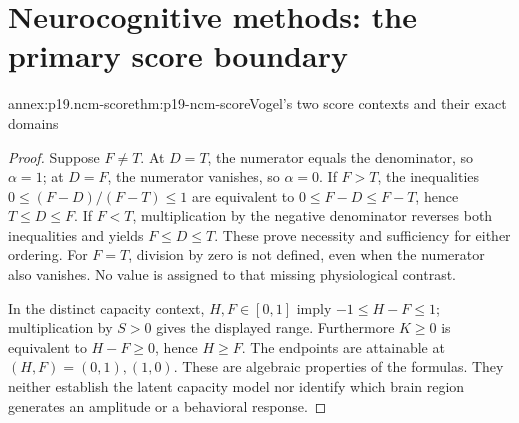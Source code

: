 \section{Neurocognitive methods: the primary score boundary}
\label{sec:p19-ncm-annex}
\begin{annexitem}{annex:p19.ncm-score}{thm:p19-ncm-score}{Vogel's two score contexts and their exact domains}
\begin{proof}
Suppose \(F\ne T\). At \(D=T\), the numerator equals
the denominator, so \(\alpha=1\); at \(D=F\), the
numerator vanishes, so \(\alpha=0\). If \(F>T\),
the inequalities \(0\leq(F-D)/(F-T)\leq1\) are
equivalent to \(0\leq F-D\leq F-T\), hence
\(T\leq D\leq F\). If \(F<T\), multiplication
by the negative denominator reverses both inequalities and yields
\(F\leq D\leq T\). These prove necessity and sufficiency
for either ordering. For \(F=T\), division by zero is not
defined, even when the numerator also vanishes. No value is
assigned to that missing physiological contrast.

In the distinct capacity context, \(H, F\in[0, 1]\) imply
\(-1\leq H-F\leq1\); multiplication by \(S>0\)
gives the displayed range. Furthermore \(K\geq0\) is
equivalent to \(H-F\geq0\), hence \(H\geq F\).
The endpoints are attainable at \((H, F)=(0, 1), (1, 0)\).
These are algebraic properties of the formulas. They neither
establish the latent capacity model nor identify which brain
region generates an amplitude or a behavioral response.
\end{proof}
\end{annexitem}
